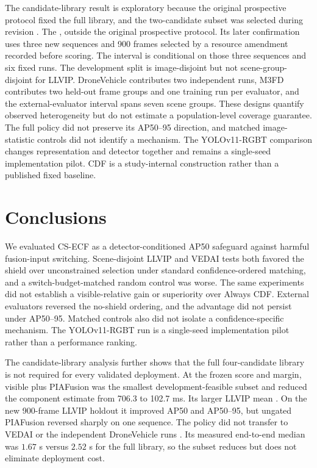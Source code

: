 \documentclass[preprint,11pt]{elsarticle}
\providecommand{\DIFaddtex}[1]{{\protect\color{blue} \sf #1}} %
\providecommand{\DIFdeltex}[1]{{\protect\color{red} \scriptsize #1}} %
\providecommand{\DIFaddbegin}{} %
\providecommand{\DIFaddend}{} %
\providecommand{\DIFdelbegin}{} %
\providecommand{\DIFdelend}{} %
\providecommand{\DIFadd}[1]{\texorpdfstring{\DIFaddtex{#1}}{#1}} %
\providecommand{\DIFdel}[1]{\texorpdfstring{\DIFdeltex{#1}}{}} %
\begin{document}
The \DIFdelbegin \DIFdel{candidate-library result is exploratory because the original prospective
protocol fixed the full library, and the }\DIFdelend two-candidate subset was selected during revision\DIFdelbegin \DIFdel{. The }\DIFdelend \DIFaddbegin \DIFadd{, outside the original
prospective protocol. Its later confirmation uses three new sequences and 900
frames selected by a resource amendment recorded before scoring. The interval
is conditional on those three sequences and six fixed runs. The }\DIFaddend development
split is image-disjoint but not scene-group-disjoint for LLVIP. DroneVehicle
contributes two independent runs, M3FD contributes two held-out frame groups\DIFdelbegin \DIFdel{and one training run per evaluator}\DIFdelend ,
and the external-evaluator interval spans seven scene groups. These designs
quantify observed heterogeneity but do not estimate \DIFdelbegin \DIFdel{a }\DIFdelend population-level coverage\DIFdelbegin \DIFdel{guarantee}\DIFdelend .
The full policy did not preserve its AP50--95 direction, and matched
image-statistic controls did not identify a mechanism. The YOLOv11-RGBT
comparison changes representation and detector together and remains a
single-seed implementation pilot. CDF is a study-internal construction rather
than a published fixed baseline.

\section{Conclusions}

We evaluated CS-ECF as a detector-conditioned AP50 safeguard against harmful
fusion-input switching. Scene-disjoint LLVIP and VEDAI tests both favored the
shield over unconstrained selection under standard confidence-ordered matching,
and a switch-budget-matched random control was worse. The same experiments did
not establish a visible-relative gain or superiority over Always CDF. External
evaluators reversed the no-shield ordering, and the advantage did not persist
under AP50--95. Matched controls also did not isolate a confidence-specific
mechanism. The YOLOv11-RGBT run is a single-seed implementation pilot rather
than a performance ranking.

The candidate-library analysis further shows that the full four-candidate
library is not required for every validated deployment. At the frozen score
and margin, visible plus PIAFusion was the smallest development-feasible
subset\DIFdelbegin \DIFdel{and reduced the component estimate from 706.3 to 102.7 ms. Its larger
LLVIP mean }\DIFdelend \DIFaddbegin \DIFadd{. On the new 900-frame LLVIP holdout it improved AP50 and AP50--95, but
ungated PIAFusion reversed sharply on one sequence. The policy }\DIFaddend did not transfer
to VEDAI or the independent DroneVehicle runs\DIFaddbegin \DIFadd{. Its measured end-to-end median
was \(1.67\) s versus \(2.52\) s for the full library, so the subset reduces
but does not eliminate deployment cost}\DIFaddend .
\end{document}
